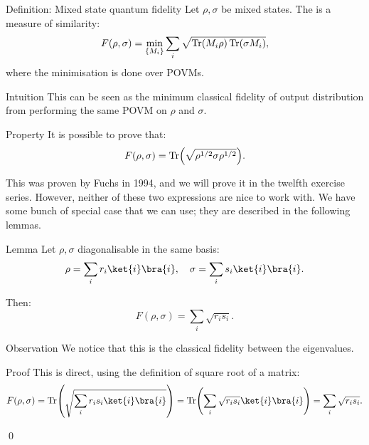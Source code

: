 \documentclass[a4paper]{article}
\begin{document}
\begin{parag}{Definition: Mixed state quantum fidelity}
    Let $\rho, \sigma$ be mixed states. The  is a measure of similarity: 
    \[F\left(\rho, \sigma\right) = \min_{\left\{M_i\right\}} \sum_{i} \sqrt{\Tr\left(M_i \rho\right) \Tr\left(\sigma M_i\right)},\]
    where the minimisation is done over POVMs.

    \begin{subparag}{Intuition}
        This can be seen as the minimum classical fidelity of output distribution from performing the same POVM on $\rho$ and $\sigma$.
    \end{subparag}

    \begin{subparag}{Property}
        It is possible to prove that: 
        \[F\left(\rho, \sigma\right) = \Tr\left(\sqrt{\rho^{1/2} \sigma \rho^{1/2}}\right).\]

        This was proven by Fuchs in 1994, and we will prove it in the twelfth exercise series. However, neither of these two expressions are nice to work with. We have some bunch of special case that we can use; they are described in the following lemmas.
    \end{subparag}
\end{parag}

\begin{parag}{Lemma}
    Let $\rho, \sigma$ diagonalisable in the same basis: 
    \[\rho = \sum_{i} r_i \ket{i}\bra{i}, \mathspace \sigma = \sum_{i} s_i \ket{i}\bra{i}.\]
    
    Then: 
    \[F\left(\rho, \sigma\right) = \sum_{i} \sqrt{r_i s_i}.\]

    \begin{subparag}{Observation}
        We notice that this is the classical fidelity between the eigenvalues.
    \end{subparag}
    
    \begin{subparag}{Proof}
        This is direct, using the definition of square root of a matrix:
        \[F\left(\rho, \sigma\right) = \Tr\left(\sqrt{\sum_{i} r_i s_i \ket{i}\bra{i}}\right) = \Tr\left(\sum_{i} \sqrt{r_i s_i} \ket{i}\bra{i}\right) = \sum_{i} \sqrt{r_i s_i}.\]

        \qed
    \end{subparag}
\end{parag}
\end{document}

